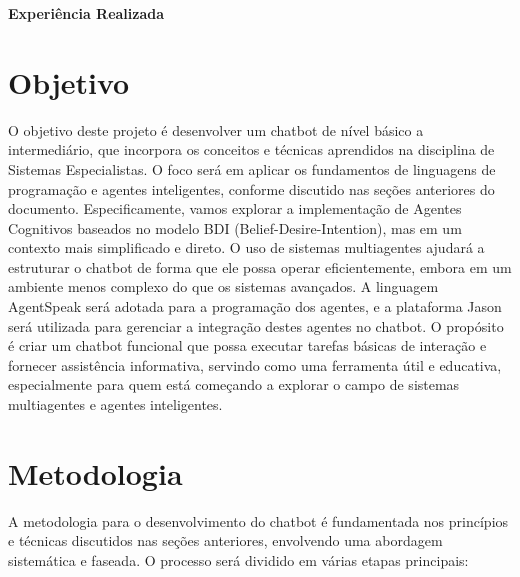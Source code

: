 \documentclass[12pt]{article}
\begin{document}
    \vspace{10mm} 
    \begin{center} 
    \Large 
    \textbf{Experiência Realizada} 
    \end{center} 

    \setcounter{section}{0}
    \section{Objetivo}

    O objetivo deste projeto é desenvolver um chatbot de nível básico a intermediário, que incorpora os conceitos e técnicas aprendidos na disciplina de Sistemas Especialistas. O foco será em aplicar os fundamentos de linguagens de programação e agentes inteligentes, conforme discutido nas seções anteriores do documento. Especificamente, vamos explorar a implementação de Agentes Cognitivos baseados no modelo BDI (Belief-Desire-Intention), mas em um contexto mais simplificado e direto. O uso de sistemas multiagentes ajudará a estruturar o chatbot de forma que ele possa operar eficientemente, embora em um ambiente menos complexo do que os sistemas avançados. A linguagem AgentSpeak será adotada para a programação dos agentes, e a plataforma Jason será utilizada para gerenciar a integração destes agentes no chatbot. O propósito é criar um chatbot funcional que possa executar tarefas básicas de interação e fornecer assistência informativa, servindo como uma ferramenta útil e educativa, especialmente para quem está começando a explorar o campo de sistemas multiagentes e agentes inteligentes.


    \section{Metodologia}

    A metodologia para o desenvolvimento do chatbot é fundamentada nos princípios e técnicas discutidos nas seções anteriores, envolvendo uma abordagem sistemática e faseada. O processo será dividido em várias etapas principais:
\end{document}
